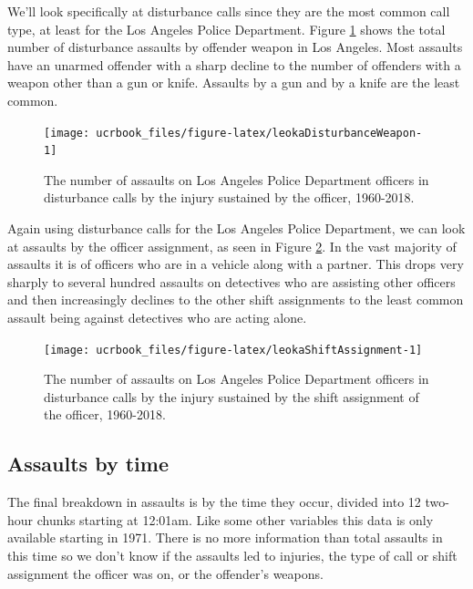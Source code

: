\documentclass[
  12pt,
  openany]{book}
\begin{document}
We'll look specifically at disturbance calls since they are the most common call type, at least for the Los Angeles Police Department. Figure \ref{fig:leokaDisturbanceWeapon} shows the total number of disturbance assaults by offender weapon in Los Angeles. Most assaults have an unarmed offender with a sharp decline to the number of offenders with a weapon other than a gun or knife. Assaults by a gun and by a knife are the least common.

\begin{figure}

{\centering \texttt{[image: ucrbook\_files/figure-latex/leokaDisturbanceWeapon-1]} 

}

\caption{The number of assaults on Los Angeles Police Department officers in disturbance calls by the injury sustained by the officer, 1960-2018.}\label{fig:leokaDisturbanceWeapon}
\end{figure}

Again using disturbance calls for the Los Angeles Police Department, we can look at assaults by the officer assignment, as seen in Figure \ref{fig:leokaShiftAssignment}. In the vast majority of assaults it is of officers who are in a vehicle along with a partner. This drops very sharply to several hundred assaults on detectives who are assisting other officers and then increasingly declines to the other shift assignments to the least common assault being against detectives who are acting alone.

\begin{figure}

{\centering \texttt{[image: ucrbook\_files/figure-latex/leokaShiftAssignment-1]} 

}

\caption{The number of assaults on Los Angeles Police Department officers in disturbance calls by the injury sustained by the shift assignment of the officer, 1960-2018.}\label{fig:leokaShiftAssignment}
\end{figure}

\hypertarget{assaults-by-time}{%
\subsection{Assaults by time}\label{assaults-by-time}}

The final breakdown in assaults is by the time they occur, divided into 12 two-hour chunks starting at 12:01am. Like some other variables this data is only available starting in 1971. There is no more information than total assaults in this time so we don't know if the assaults led to injuries, the type of call or shift assignment the officer was on, or the offender's weapons.
\end{document}
